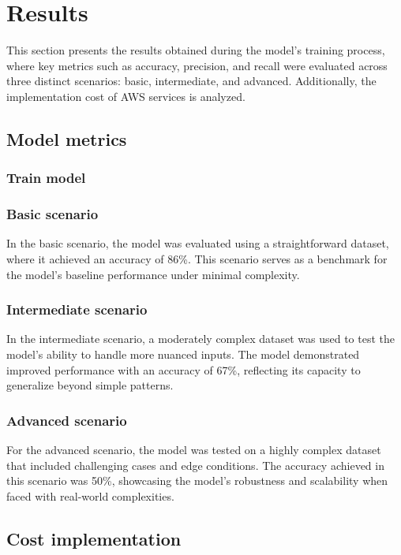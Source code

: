 \section{Results}

This section presents the results obtained during the model's training process, where key metrics such as accuracy, precision, and recall were evaluated across three distinct scenarios: basic, intermediate, and advanced. Additionally, the implementation cost of AWS services is analyzed.


\subsection{Model metrics}

\subsubsection{Train model}

\subsubsection{Basic scenario}

In the basic scenario, the model was evaluated using a straightforward dataset, where it achieved an accuracy of 86\%. This scenario serves as a benchmark for the model's baseline performance under minimal complexity.

\subsubsection{Intermediate scenario}

In the intermediate scenario, a moderately complex dataset was used to test the model's ability to handle more nuanced inputs. The model demonstrated improved performance with an accuracy of 67\%, reflecting its capacity to generalize beyond simple patterns.

\subsubsection{Advanced scenario}

For the advanced scenario, the model was tested on a highly complex dataset that included challenging cases and edge conditions. The accuracy achieved in this scenario was 50\%, showcasing the model's robustness and scalability when faced with real-world complexities.

\subsection{Cost implementation}

